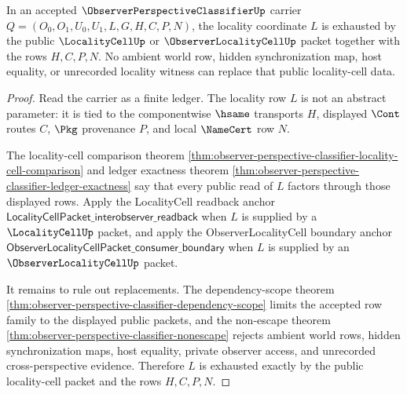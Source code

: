 \begin{theorem}
\label{thm:observer-perspective-classifier-locality-cell-exhaustion}
In an accepted $\ObserverPerspectiveClassifierUp$ carrier $Q=(O_0,O_1,U_0,U_1,L,G,H,C,P,N)$, the locality coordinate $L$ is exhausted by the public $\LocalityCellUp$ or $\ObserverLocalityCellUp$ packet together with the rows $H,C,P,N$. No ambient world row, hidden synchronization map, host equality, or unrecorded locality witness can replace that public locality-cell data.
\end{theorem}
\begin{proof}
Read the carrier as a finite ledger. The locality row $L$ is not an abstract parameter: it is tied to the componentwise $\hsame$ transports $H$, displayed $\Cont$ routes $C$, $\Pkg$ provenance $P$, and local $\NameCert$ row $N$.

The locality-cell comparison theorem \autoref{thm:observer-perspective-classifier-locality-cell-comparison} and ledger exactness theorem \autoref{thm:observer-perspective-classifier-ledger-exactness} say that every public read of $L$ factors through those displayed rows. Apply the LocalityCell readback anchor $\mathsf{LocalityCellPacket\_interobserver\_readback}$ when $L$ is supplied by a $\LocalityCellUp$ packet, and apply the ObserverLocalityCell boundary anchor $\mathsf{ObserverLocalityCellPacket\_consumer\_boundary}$ when $L$ is supplied by an $\ObserverLocalityCellUp$ packet.

It remains to rule out replacements. The dependency-scope theorem \autoref{thm:observer-perspective-classifier-dependency-scope} limits the accepted row family to the displayed public packets, and the non-escape theorem \autoref{thm:observer-perspective-classifier-nonescape} rejects ambient world rows, hidden synchronization maps, host equality, private observer access, and unrecorded cross-perspective evidence. Therefore $L$ is exhausted exactly by the public locality-cell packet and the rows $H,C,P,N$.
\end{proof}

